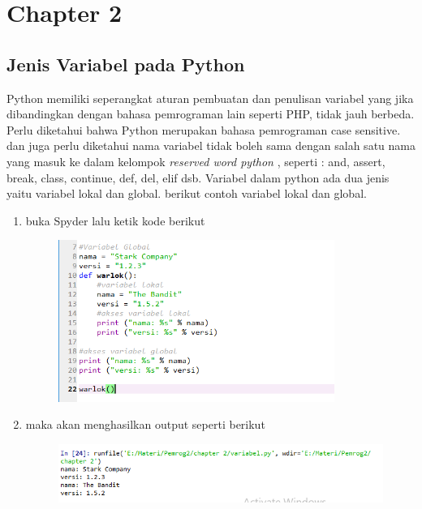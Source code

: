 

\chapter*{Chapter 2}
\section*{Jenis Variabel pada Python}
\par

 
Python memiliki seperangkat aturan pembuatan dan penulisan variabel yang jika dibandingkan dengan bahasa pemrograman lain seperti PHP, tidak jauh berbeda. Perlu diketahui bahwa Python merupakan bahasa pemrograman case sensitive. dan juga perlu diketahui nama variabel tidak boleh sama dengan salah satu nama yang masuk ke dalam kelompok {\textit{reserved word python}} , seperti : and, assert, break, class, continue, def, del, elif dsb. Variabel dalam python ada dua jenis yaitu variabel lokal dan global. berikut contoh variabel lokal dan global.

\begin{enumerate}
	\item buka Spyder lalu ketik kode berikut
	\begin{figure} [h]
	\includegraphics[width=9cm]{variabel/var1.png}
	\centering
	\end{figure}
	

	\item maka akan menghasilkan output seperti berikut
	\begin{figure} [h]
	\includegraphics[width=12cm]{variabel/var2.png}
	\centering
	\end{figure}
	
	
\end{enumerate}